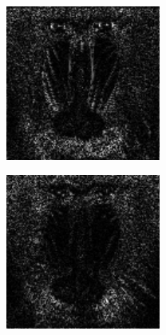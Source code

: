 \begin{figure}
\begin{subfigure}{0.4\textwidth}
       \end{subfigure}%
    \hfill
        \begin{subfigure}{0.4\textwidth}\centering
                    \includegraphics[width=\linewidth]{figures/mandrill3.pdf}
       \end{subfigure}%
        \begin{subfigure}{0.4\textwidth}\centering
                    \includegraphics[width=\linewidth]{figures/mandrill4.pdf}

\end{subfigure}
\end{figure}
